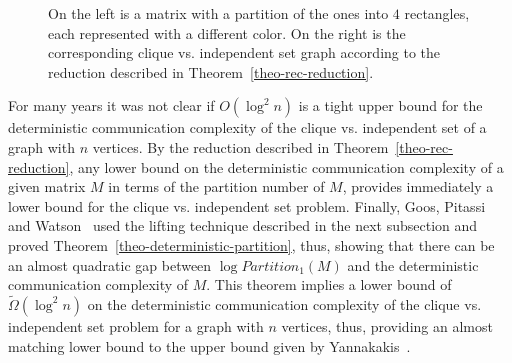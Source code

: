 \documentclass[11pt]{article}
\begin{document}
\begin{figure}[htb!]
\centering
{}
\caption{On the left is a matrix with a partition of the ones into $4$ rectangles, each represented with a different color.
On the right is the corresponding clique vs. independent set graph according to the reduction described in Theorem~\ref{theo-rec-reduction}.}
\label{fig-rec-reduction}
\end{figure}

For many years it was not clear if $O(\log^2 n)$ is a tight upper bound for the deterministic communication complexity of the clique vs. independent set of a graph with $n$ vertices.
By the reduction described in Theorem~\ref{theo-rec-reduction}, any lower bound on the deterministic communication complexity of a given matrix $M$ in terms of the partition number of $M$,
provides immediately a lower bound for the clique vs. independent set problem.
Finally, Goos,  Pitassi and Watson~\cite{Goos} used the lifting technique described in the next subsection and
proved Theorem~\ref{theo-deterministic-partition}, thus, showing that
there can be an almost quadratic gap between $\log Partition_1(M) $ and the deterministic communication complexity of $M$.
This theorem implies a lower bound of $\widetilde{\Omega}(\log^2 n)$ on the deterministic communication  complexity of
the clique vs. independent set problem for a graph with $n$ vertices, thus, providing an almost matching lower bound to the upper bound given by Yannakakis~\cite{Yannakakis91}.
\end{document}
